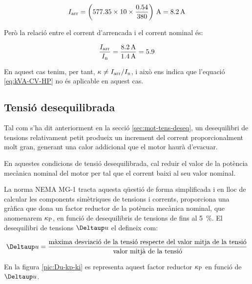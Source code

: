\begin{exemple}[\MotorArrencNEMA{}]
    \[
      I\ped{arr} = \left(\num{577,35} \times 10 \times \frac{\num{0,54}}{380}\right) \,\unit{A} = \qty{8,2}{A}
    \]

    Però la relació entre el corrent d'arrencada i el corrent nominal és:
    
    \[
        \frac{I_\mathrm{arr}}{I_\mathrm{n}} = \frac{\qty{8,2}{A}}{\qty{1,4}{A}} = \num{5,9}
    \]

    En aquest cas tenim, per tant, $\kappa \neq I_\mathrm{arr}/I_\mathrm{n}$, i això ens indica que l'equació \eqref{eq:kVA-CV-HP} no és aplicable en aquest cas.
\end{exemple}

\subsection{Tensió desequilibrada}\label{sec:NEMA-U-deseq}

Tal com s'ha dit anteriorment en la secció \ref{sec:mot-tens-deseq}, un desequilibri de tensions relativament petit produeix un increment del corrent proporcionalment molt gran, generant una  calor addicional que el motor haurà d'evacuar.

En aquestes condicions de tensió desequilibrada, cal reduir el valor de la potència mecànica nominal del motor per tal que el corrent baixi al seu valor nominal.

La norma NEMA MG-1 tracta aquesta qüestió de forma simplificada i en lloc de calcular les components simètriques de tensions i corrents, proporciona una gràfica que dona un factor reductor de la potència mecànica nominal, que anomenarem $\kappa_\mathrm{P}$, en funció de desequilibris de tensions de fins al \qty{5}{\%}. El desequilibri de tensions $\Deltaup u$ el defineix com:

\begin{equation}
    \Deltaup u = \frac{\text{màxima desviació de la tensió respecte del valor mitja de la tensió}}{\text{valor mitjà de la tensió}}
\end{equation}

En la figura \vref{pic:Du-kp-ki} es representa aquest factor reductor $\kappa_\mathrm{P}$ en funció de $\Deltaup u$.

\begin{center}
    
    \label{pic:Du-kp-ki}
\end{center}



